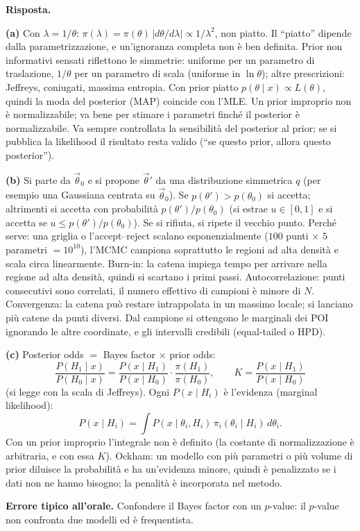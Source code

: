 \documentclass[11pt,a4paper]{article}
\newcommand{\Ris}[1]{\noindent\textbf{Risposta.}\par\nopagebreak #1}
\newcommand{\Trap}[1]{\par\smallskip\noindent\textbf{Errore tipico all'orale.} #1\par}
\begin{document}
\Ris{
\textbf{(a)} Con $\lambda=1/\theta$: $\pi(\lambda)=\pi(\theta)\,|d\theta/d\lambda|\propto1/\lambda^2$, non piatto. Il ``piatto'' dipende dalla parametrizzazione, e un'ignoranza completa non \`e ben definita.
Prior non informativi sensati riflettono le simmetrie: uniforme per un parametro di traslazione, $1/\theta$ per un parametro di scala (uniforme in $\ln\theta$); altre prescrizioni: Jeffreys, coniugati, massima entropia.
Con prior piatto $p(\theta\mid x)\propto L(\theta)$, quindi la moda del posterior (MAP) coincide con l'MLE.
Un prior improprio non \`e normalizzabile; va bene per stimare i parametri finch\'e il posterior \`e normalizzabile.
Va sempre controllata la sensibilit\`a del posterior al prior; se si pubblica la likelihood il risultato resta valido (``se questo prior, allora questo posterior'').

\textbf{(b)} Si parte da $\vec\theta_0$ e si propone $\vec\theta'$ da una distribuzione simmetrica $q$ (per esempio una Gaussiana centrata su $\vec\theta_0$). Se $p(\theta')>p(\theta_0)$ si accetta; altrimenti si accetta con probabilit\`a $p(\theta')/p(\theta_0)$ (si estrae $u\in[0,1]$ e si accetta se $u\le p(\theta')/p(\theta_0)$). Se si rifiuta, si ripete il vecchio punto.
Perch\'e serve: una griglia o l'accept--reject scalano esponenzialmente ($100$ punti $\times$ $5$ parametri $=10^{10}$), l'MCMC campiona soprattutto le regioni ad alta densit\`a e scala circa linearmente.
Burn-in: la catena impiega tempo per arrivare nella regione ad alta densit\`a, quindi si scartano i primi passi.
Autocorrelazione: punti consecutivi sono correlati, il numero effettivo di campioni \`e minore di $N$.
Convergenza: la catena pu\`o restare intrappolata in un massimo locale; si lanciano pi\`u catene da punti diversi.
Dal campione si ottengono le marginali dei POI ignorando le altre coordinate, e gli intervalli credibili (equal-tailed o HPD).

\textbf{(c)} Posterior odds $=$ Bayes factor $\times$ prior odds:
\[
\frac{P(H_1\mid x)}{P(H_0\mid x)}=\frac{P(x\mid H_1)}{P(x\mid H_0)}\cdot\frac{\pi(H_1)}{\pi(H_0)} ,\qquad K=\frac{P(x\mid H_1)}{P(x\mid H_0)}
\]
(si legge con la scala di Jeffreys). Ogni $P(x\mid H_i)$ \`e l'evidenza (marginal likelihood):
\[
P(x\mid H_i)=\int P(x\mid\theta_i,H_i)\,\pi_i(\theta_i\mid H_i)\,d\theta_i .
\]
Con un prior improprio l'integrale non \`e definito (la costante di normalizzazione \`e arbitraria, e con essa $K$).
Ockham: un modello con pi\`u parametri o pi\`u volume di prior diluisce la probabilit\`a e ha un'evidenza minore, quindi \`e penalizzato se i dati non ne hanno bisogno; la penalit\`a \`e incorporata nel metodo.
}
\Trap{Confondere il Bayes factor con un $p$-value: il $p$-value non confronta due modelli ed \`e frequentista.}
\end{document}
